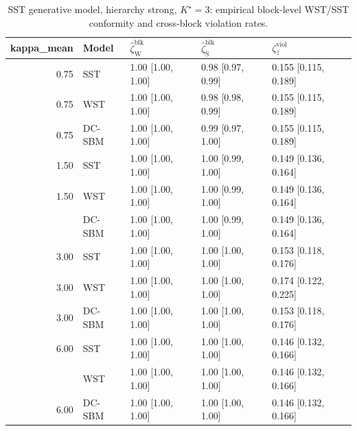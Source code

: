 \begin{table}
\centering
\caption{SST generative model, hierarchy strong, $K^\star=3$: empirical block-level WST/SST conformity and cross-block violation rates.}
\centering
\begin{tabular}[t]{rllll}
\toprule
kappa_mean & Model & $\widehat\zeta_{\mathrm{W}}^{\mathrm{blk}}$ & $\widehat\zeta_{\mathrm{S}}^{\mathrm{blk}}$ & $\zeta^{\mathrm{viol}}_{\hat z}$\\
\midrule
0.75 & SST & 1.00 [1.00, 1.00] & 0.98 [0.97, 0.99] & 0.155 [0.115, 0.189]\\
0.75 & WST & 1.00 [1.00, 1.00] & 0.98 [0.98, 0.99] & 0.155 [0.115, 0.189]\\
0.75 & DC-SBM & 1.00 [1.00, 1.00] & 0.99 [0.97, 1.00] & 0.155 [0.115, 0.189]\\
1.50 & SST & 1.00 [1.00, 1.00] & 1.00 [0.99, 1.00] & 0.149 [0.136, 0.164]\\
1.50 & WST & 1.00 [1.00, 1.00] & 1.00 [0.99, 1.00] & 0.149 [0.136, 0.164]\\
\addlinespace
1.50 & DC-SBM & 1.00 [1.00, 1.00] & 1.00 [0.99, 1.00] & 0.149 [0.136, 0.164]\\
3.00 & SST & 1.00 [1.00, 1.00] & 1.00 [1.00, 1.00] & 0.153 [0.118, 0.176]\\
3.00 & WST & 1.00 [1.00, 1.00] & 1.00 [1.00, 1.00] & 0.174 [0.122, 0.225]\\
3.00 & DC-SBM & 1.00 [1.00, 1.00] & 1.00 [1.00, 1.00] & 0.153 [0.118, 0.176]\\
6.00 & SST & 1.00 [1.00, 1.00] & 1.00 [1.00, 1.00] & 0.146 [0.132, 0.166]\\
\addlinespace
6.00 & WST & 1.00 [1.00, 1.00] & 1.00 [1.00, 1.00] & 0.146 [0.132, 0.166]\\
6.00 & DC-SBM & 1.00 [1.00, 1.00] & 1.00 [1.00, 1.00] & 0.146 [0.132, 0.166]\\
\bottomrule
\end{tabular}
\end{table}
